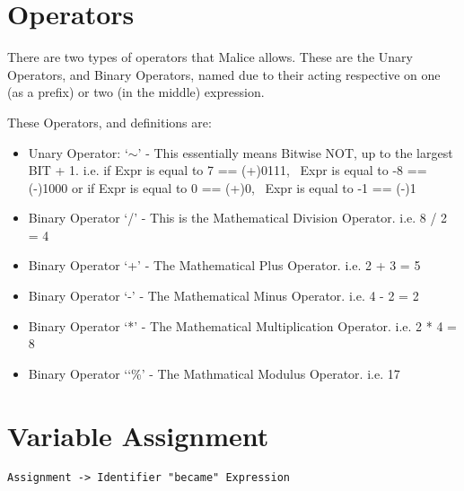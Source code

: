 \documentclass[a4wide, 11pt]{article}
\begin{document}
\section{Operators}

There are two types of operators that Malice allows. These are the Unary Operators, and Binary Operators, named due to their acting respective on one (as a prefix) or two (in the middle) expression.

These Operators, and definitions are:

\begin{itemize}

\item
Unary Operator: `$\sim$' - This essentially means Bitwise NOT, up to the largest BIT + 1.
i.e. \vspace{0.75mm} \hspace{25mm} \hspace{12mm} if Expr is equal to 7 == (+)0111, ~Expr is equal to -8 == (-)1000
or \vspace{0.75mm} \hspace{25mm} \hspace{13mm} if Expr is equal to  0 == (+)0, ~Expr is equal to -1 == (-)1
\item
Binary Operator `/' \hspace{2mm}- This is the Mathematical Division Operator. i.e. 8 / 2 = 4
\item
Binary Operator `+' \hspace{1mm}- The Mathematical Plus Operator. i.e. 2 + 3 = 5
\item 
Binary Operator `-'\hspace{3mm} - The Mathematical Minus Operator. i.e. 4 - 2 = 2
\item
Binary Operator `*'\hspace{2.5mm} - The Mathematical Multiplication Operator. i.e. 2 * 4 = 8
\item
Binary Operator `\char`\%'\hspace{1mm} - The Mathmatical Modulus Operator. i.e.  17 %

\end{itemize}


\section{Variable Assignment}

\begin{verbatim}
Assignment -> Identifier "became" Expression
\end{verbatim}
\end{document}
